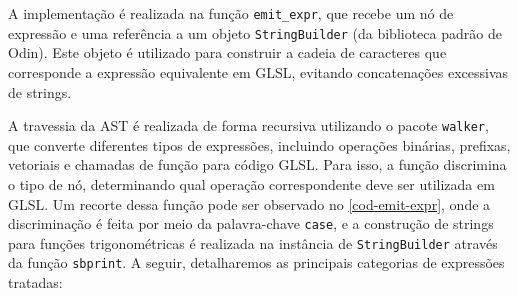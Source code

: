 A implementação é realizada na função \verb"emit_expr", que recebe um nó de expressão e uma referência a um objeto \verb"StringBuilder" (da biblioteca padrão de Odin). Este objeto é utilizado para construir a cadeia de caracteres que corresponde a expressão equivalente em GLSL, evitando concatenações excessivas de strings.

A travessia da AST é realizada de forma recursiva utilizando o pacote \texttt{walker}, que converte diferentes tipos de expressões, incluindo operações binárias, prefixas, vetoriais e chamadas de função para código GLSL. Para isso, a função discrimina o tipo de nó, determinando qual operação correspondente deve ser utilizada em GLSL. Um recorte dessa função pode ser observado no \autoref{cod-emit-expr}, onde a discriminação é feita por meio da palavra-chave \texttt{case}, e a construção de strings para funções trigonométricas é realizada na instância de \texttt{StringBuilder} através da função \verb|sbprint|. A seguir, detalharemos as principais categorias de expressões tratadas:


